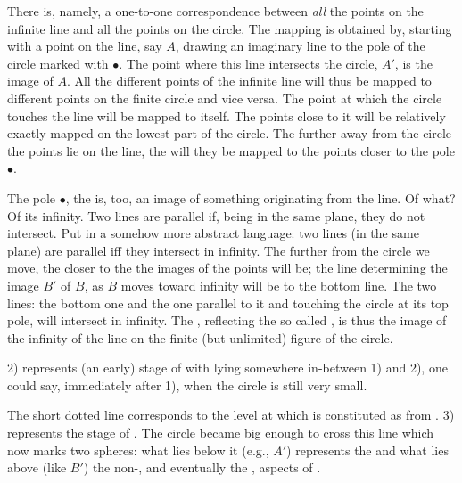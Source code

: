 \noindent
There is, namely, a one-to-one correspondence between {\em all} the points on
the infinite line and all the points on the circle. The mapping is obtained by,
starting with a point on the line, say $A$, drawing an imaginary line to the
pole of the circle marked with $\bullet$. The point where this line intersects
the circle, $A'$, is the image of $A$.
All the different points of the infinite line will thus be mapped to different
points on the finite circle and vice versa.  The point at which the circle
touches the line will be mapped to itself. The points close to it will be
relatively exactly mapped on the lowest part of the circle.  The further away
from the circle the points lie on the line, the  will they be mapped
to the points closer to the pole $\bullet$.

The pole $\bullet$, the  is, too, an image of something originating
from the line. Of what? Of its infinity.  Two lines are parallel if, being in
the same plane, they do not intersect. Put in a somehow more abstract language:
two lines (in the same plane) are parallel iff they intersect in
infinity. The further from the circle we move, the closer to the  the
images of the points will be; the line determining the image $B'$ of $B$, as $B$
moves toward infinity will be  to the bottom line.
The two lines: the bottom one and the one parallel to it and touching the circle
at its top pole, will intersect in infinity.  The , reflecting the
so called , is thus the image of the infinity of the line
on the finite (but unlimited) figure of the circle.

2) represents (an early) stage of  with  lying
somewhere in-between 1) and 2), one could say, immediately after 1), when the
circle is still very small.

The short dotted line corresponds to the level at which  is
constituted as  from .  3) represents the
stage of . The circle became big enough to cross this
line which now marks two spheres: what lies below it (e.g., $A'$) represents the
 and what lies above (like $B'$) the non-, and eventually
the , aspects of .

